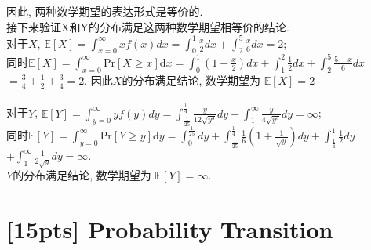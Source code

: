 \documentclass{article}
\begin{document}
\indent 因此, 两种数学期望的表达形式是等价的.\\
\indent 接下来验证X和Y的分布满足这两种数学期望相等价的结论.\\
\indent 对于$X$, $\mathbb{E}[X]=\int_{x=0}^\infty xf(x)dx=\int_{0}^{1}\frac{x}{2}dx+\int_{2}^{5}\frac{x}{6}dx=2$;\\
\indent 同时$\mathbb{E}[X]=\int^\infty_{x=0} \mathrm{Pr}[X\geq x]\mathrm{d}x=\int^{1}_{0}(1-\frac{x}{2})dx+\int^{2}_{1}\frac{1}{2}dx+\int_{2}^{5}\frac{5-x}{6}dx$\\
\indent$=\frac{3}{4}+\frac{1}{2}+\frac{3}{4}=2$. 因此$X$的分布满足结论, 数学期望为 $\mathbb{E}[X]=2$\\\\
\indent 对于$Y$, $\mathbb{E}[Y]=\int_{y=0}^\infty yf(y)dy=\int_{\frac{1}{25}}^{\frac{1}{4}}\frac{y}{12\sqrt{y^3}}dy+\int_{1}^{\infty}\frac{y}{4\sqrt{y^3}}dy=\infty$;\\
\indent 同时$\mathbb{E}[Y]=\int^\infty_{y=0} \mathrm{Pr}[Y\geq y]\mathrm{d}y=\int^{\frac{1}{25}}_{0}dy+\int^{\frac{1}{4}}_{\frac{1}{25}}\frac{1}{6}(1+\frac{1}{\sqrt y})dy+\int_{\frac{1}{4}}^{1}\frac{1}{2}dy$\\
\indent$+\int_{1}^{\infty}\frac{1}{2\sqrt{y}}dy= \infty$. \\
$Y$的分布满足结论, 数学期望为 $\mathbb{E}[Y]=\infty$.\\
	
	\section{[15pts] Probability Transition}
\end{document}
